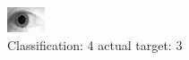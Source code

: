 \begin{figure}[h!]
\begin{center}
\includegraphics[width=0.60\columnwidth]{figures/ID1851_class_4_target_3.png}
\end{center}
\caption{ Classification: 4 actual target: 3}
\label{fig:ID1851_class_4_target_3}
\end{figure}
